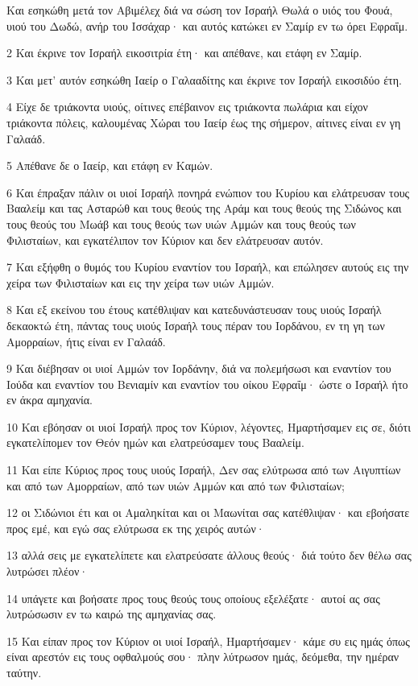 \par Και εσηκώθη μετά τον Αβιμέλεχ διά να σώση τον Ισραήλ Θωλά ο υιός του Φουά, υιού του Δωδώ, ανήρ του Ισσάχαρ· και αυτός κατώκει εν Σαμίρ εν τω όρει Εφραΐμ.
\par 2 Και έκρινε τον Ισραήλ εικοσιτρία έτη· και απέθανε, και ετάφη εν Σαμίρ.
\par 3 Και μετ' αυτόν εσηκώθη Ιαείρ ο Γαλααδίτης και έκρινε τον Ισραήλ εικοσιδύο έτη.
\par 4 Είχε δε τριάκοντα υιούς, οίτινες επέβαινον εις τριάκοντα πωλάρια και είχον τριάκοντα πόλεις, καλουμένας Χώραι του Ιαείρ έως της σήμερον, αίτινες είναι εν γη Γαλαάδ.
\par 5 Απέθανε δε ο Ιαείρ, και ετάφη εν Καμών.
\par 6 Και έπραξαν πάλιν οι υιοί Ισραήλ πονηρά ενώπιον του Κυρίου και ελάτρευσαν τους Βααλείμ και τας Ασταρώθ και τους θεούς της Αράμ και τους θεούς της Σιδώνος και τους θεούς του Μωάβ και τους θεούς των υιών Αμμών και τους θεούς των Φιλισταίων, και εγκατέλιπον τον Κύριον και δεν ελάτρευσαν αυτόν.
\par 7 Και εξήφθη ο θυμός του Κυρίου εναντίον του Ισραήλ, και επώλησεν αυτούς εις την χείρα των Φιλισταίων και εις την χείρα των υιών Αμμών.
\par 8 Και εξ εκείνου του έτους κατέθλιψαν και κατεδυνάστευσαν τους υιούς Ισραήλ δεκαοκτώ έτη, πάντας τους υιούς Ισραήλ τους πέραν του Ιορδάνου, εν τη γη των Αμορραίων, ήτις είναι εν Γαλαάδ.
\par 9 Και διέβησαν οι υιοί Αμμών τον Ιορδάνην, διά να πολεμήσωσι και εναντίον του Ιούδα και εναντίον του Βενιαμίν και εναντίον του οίκου Εφραΐμ· ώστε ο Ισραήλ ήτο εν άκρα αμηχανία.
\par 10 Και εβόησαν οι υιοί Ισραήλ προς τον Κύριον, λέγοντες, Ημαρτήσαμεν εις σε, διότι εγκατελίπομεν τον Θεόν ημών και ελατρεύσαμεν τους Βααλείμ.
\par 11 Και είπε Κύριος προς τους υιούς Ισραήλ, Δεν σας ελύτρωσα από των Αιγυπτίων και από των Αμορραίων, από των υιών Αμμών και από των Φιλισταίων;
\par 12 οι Σιδώνιοι έτι και οι Αμαληκίται και οι Μαωνίται σας κατέθλιψαν· και εβοήσατε προς εμέ, και εγώ σας ελύτρωσα εκ της χειρός αυτών·
\par 13 αλλά σεις με εγκατελίπετε και ελατρεύσατε άλλους θεούς· διά τούτο δεν θέλω σας λυτρώσει πλέον·
\par 14 υπάγετε και βοήσατε προς τους θεούς τους οποίους εξελέξατε· αυτοί ας σας λυτρώσωσιν εν τω καιρώ της αμηχανίας σας.
\par 15 Και είπαν προς τον Κύριον οι υιοί Ισραήλ, Ημαρτήσαμεν· κάμε συ εις ημάς όπως είναι αρεστόν εις τους οφθαλμούς σου· πλην λύτρωσον ημάς, δεόμεθα, την ημέραν ταύτην.
